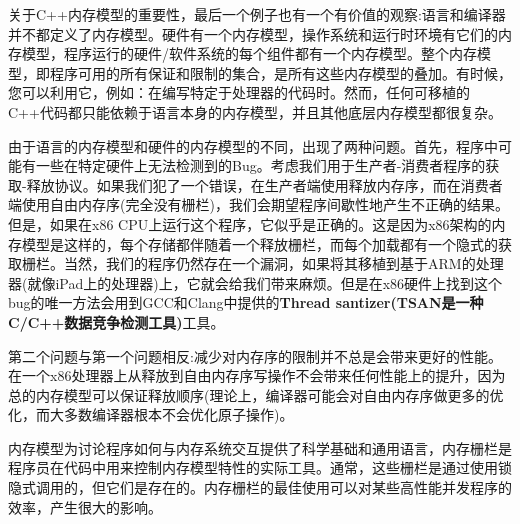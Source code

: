 关于C++内存模型的重要性，最后一个例子也有一个有价值的观察:语言和编译器并不都定义了内存模型。硬件有一个内存模型，操作系统和运行时环境有它们的内存模型，程序运行的硬件/软件系统的每个组件都有一个内存模型。整个内存模型，即程序可用的所有保证和限制的集合，是所有这些内存模型的叠加。有时候，您可以利用它，例如：在编写特定于处理器的代码时。然而，任何可移植的C++代码都只能依赖于语言本身的内存模型，并且其他底层内存模型都很复杂。

由于语言的内存模型和硬件的内存模型的不同，出现了两种问题。首先，程序中可能有一些在特定硬件上无法检测到的Bug。考虑我们用于生产者-消费者程序的获取-释放协议。如果我们犯了一个错误，在生产者端使用释放内存序，而在消费者端使用自由内存序(完全没有栅栏)，我们会期望程序间歇性地产生不正确的结果。但是，如果在x86 CPU上运行这个程序，它似乎是正确的。这是因为x86架构的内存模型是这样的，每个存储都伴随着一个释放栅栏，而每个加载都有一个隐式的获取栅栏。当然，我们的程序仍然存在一个漏洞，如果将其移植到基于ARM的处理器(就像iPad上的处理器)上，它就会给我们带来麻烦。但是在x86硬件上找到这个bug的唯一方法会用到GCC和Clang中提供的\textbf{Thread santizer(TSAN是一种C/C++数据竞争检测工具)}工具。

第二个问题与第一个问题相反:减少对内存序的限制并不总是会带来更好的性能。在一个x86处理器上从释放到自由内存序写操作不会带来任何性能上的提升，因为总的内存模型可以保证释放顺序(理论上，编译器可能会对自由内存序做更多的优化，而大多数编译器根本不会优化原子操作)。

内存模型为讨论程序如何与内存系统交互提供了科学基础和通用语言，内存栅栏是程序员在代码中用来控制内存模型特性的实际工具。通常，这些栅栏是通过使用锁隐式调用的，但它们是存在的。内存栅栏的最佳使用可以对某些高性能并发程序的效率，产生很大的影响。














